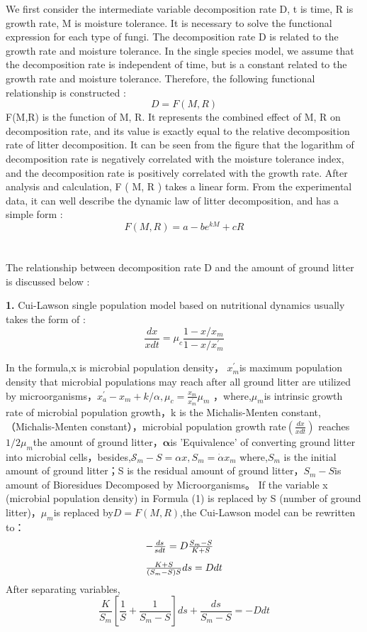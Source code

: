 \documentclass{mcmthesis}
\begin{document}
We first consider the intermediate variable decomposition rate D, t is time, R is growth rate, M is moisture tolerance. It is necessary to solve the functional expression for each type of fungi. The decomposition rate D is related to the growth rate and moisture tolerance. In the single species model, we assume that the decomposition rate is independent of time, but is a constant related to the growth rate and moisture tolerance. Therefore, the following functional relationship is constructed :
$$D=F(M,R)$$
F(M,R) is the function of M, R. It represents the combined effect of M, R on decomposition rate, and its value is exactly equal to the relative decomposition rate of litter decomposition.
It can be seen from the figure that the logarithm of decomposition rate is negatively correlated with the moisture tolerance index, and the decomposition rate is positively correlated with the growth rate. After analysis and calculation, F ( M, R ) takes a linear form. From the experimental data, it can well describe the dynamic law of litter decomposition, and has a simple form :
$$F(M,R)=a-b e^{kM}+c R$$
\\
\\
The relationship between decomposition rate D and the amount of ground litter is discussed below :

\textbf{1.} \quad Cui-Lawson single population model based on nutritional dynamics usually takes the form of :
$$	\frac{d x}{x d t}=\mu_{c} \frac{1-x / x_{m}}{1-x / x_{m}^{\prime}}$$

In the formula,x is microbial population density， $x_{m}^{\prime}$is maximum population density that microbial populations may reach after all ground litter are utilized by microorganisms，$ x_{a}^{\prime}-x_{m}+k / \alpha, \mu_{c}=\frac{x_{m}}{x_{m}^{\prime}} \mu_{m}$
，where,$ \mu_{m}$is intrinsic growth rate of microbial population growth，k is the Michalis-Menten constant,（Michalis-Menten constant），microbial population growth rate$\left(\frac{d x}{x dt}\right)$ reaches$1 / 2 \mu_{m}$the amount of ground litter，$\boldsymbol{\alpha}$is 'Equivalence' of converting ground litter into microbial cells，besides,$\mathcal{S}_{m}-S=\alpha x, S_{m}=\dot{\alpha} x_{m}$
where,$S_m$ is the initial amount of ground litter；S is the residual amount of ground litter，$S_m-S$is amount of Bioresidues Decomposed by Microorganisms。
If the variable x (microbial population density) in Formula (1) is replaced by S  (number of ground litter)，$\mu_{m}$is replaced by$D=F(M,R)$,the Cui-Lawson model can be rewritten to：
$$	
\begin{array}{l}
	-\frac{d s}{s d t}=D \frac{S_{m}-S}{K+S} \vspace{2ex}  \\ 
	\frac{K+S}{\left(S_{m}-S\right) S} d s=D d t
\end{array}
$$
After separating variables,$$\frac{K}{S_{m}}\left[\frac{1}{S}+\frac{1}{S_{m}-S}\right] d s+\frac{d s}{S_{m}-S}=-D d t$$
\end{document}

